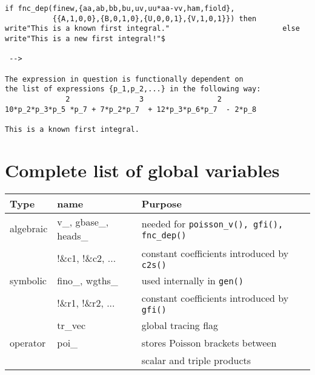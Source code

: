 \documentclass[12pt]{article}
\begin{document}
\begin{description}
\begin{verbatim}
if fnc_dep(finew,{aa,ab,bb,bu,uv,uu*aa-vv,ham,fiold},
           {{A,1,0,0},{B,0,1,0},{U,0,0,1},{V,1,0,1}}) then
write"This is a known first integral."                          else
write"This is a new first integral!"$

 -->

The expression in question is functionally dependent on
the list of expressions {p_1,p_2,...} in the following way:
              2                3                 2
10*p_2*p_3*p_5 *p_7 + 7*p_2*p_7  + 12*p_3*p_6*p_7  - 2*p_8

This is a known first integral. \end{verbatim}
\end{description}

\section{Complete list of global variables}

\begin{center}
\begin{tabular}{l|l|l}
 Type      &  name    & Purpose \\ \hline
 algebraic &  v\_, gbase\_, heads\_ & needed for {\tt poisson\_v(),
                                      gfi(), fnc\_dep()} \\
           &  !\&c1, !\&c2, ...     & constant coefficients introduced
                                      by {\tt c2s()}   \\ \hline
 symbolic  &  fino\_, wgths\_       & used internally in {\tt gen()} \\
           &  !\&r1, !\&r2, ...     & constant coefficients introduced
                                      by {\tt gfi()}   \\
           &  tr\_vec               & global tracing flag \\ \hline
 operator  &  poi\_                 & stores Poisson brackets between \\
           &                        & scalar and triple products
\end{tabular}
\end{center}
\end{document}
